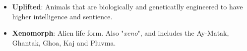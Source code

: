 \documentclass[10pt,twoside]{article}
\begin{document}
\begin{multicols}{2}
\begin{itemize}
    \item \textbf{Uplifted}: Animals that are biologically and geneticatlly engineered to have higher intelligence and sentience.

    \item \textbf{Xenomorph}: Alien life form. Also "\textit{xeno}", and includes the Ay-Matak, Ghantak, Ghoa, Kaj and Pluvma.

  \end{itemize}

  \end{multicols}
\end{document}

